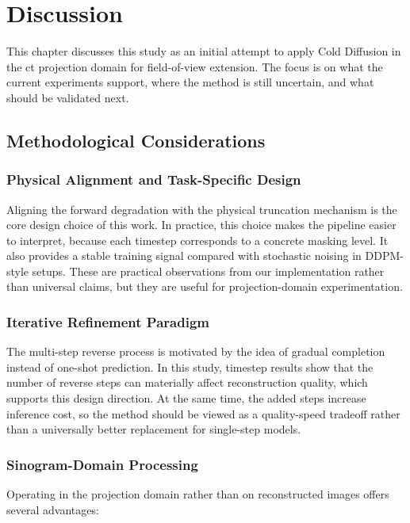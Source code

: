 \chapter{Discussion}
\label{ch:discussion}

This chapter discusses this study as an initial attempt to apply Cold Diffusion in the \gls{ct} projection domain for field-of-view extension. The focus is on what the current experiments support, where the method is still uncertain, and what should be validated next.

\section{Methodological Considerations}

\subsection{Physical Alignment and Task-Specific Design}

Aligning the forward degradation with the physical truncation mechanism is the core design choice of this work. In practice, this choice makes the pipeline easier to interpret, because each timestep corresponds to a concrete masking level. It also provides a stable training signal compared with stochastic noising in DDPM-style setups. These are practical observations from our implementation rather than universal claims, but they are useful for projection-domain experimentation.

\subsection{Iterative Refinement Paradigm}

The multi-step reverse process is motivated by the idea of gradual completion instead of one-shot prediction. In this study, timestep results show that the number of reverse steps can materially affect reconstruction quality, which supports this design direction. At the same time, the added steps increase inference cost, so the method should be viewed as a quality-speed tradeoff rather than a universally better replacement for single-step models.

\subsection{Sinogram-Domain Processing}

Operating in the projection domain rather than on reconstructed images offers several advantages:

